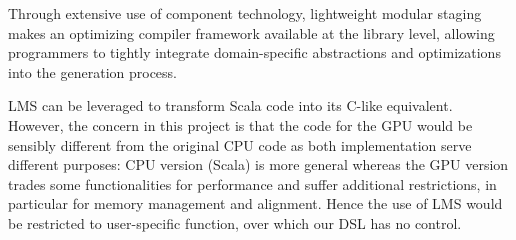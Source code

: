  Through extensive use of component technology, lightweight modular staging makes an optimizing compiler framework available at the library level, allowing programmers to tightly integrate domain-specific abstractions and optimizations into the generation process.

LMS can be leveraged to transform Scala code into its C-like equivalent. However, the concern in this project is that the code for the GPU would be sensibly different from the original CPU code as both implementation serve different purposes: CPU version (Scala) is more general whereas the GPU version trades some functionalities for performance and suffer additional restrictions, in particular for memory management and alignment. Hence the use of LMS would be restricted to user-specific function, over which our DSL has no control.
